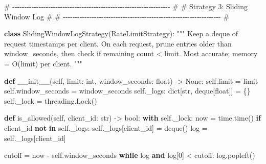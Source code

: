 \documentclass[11pt]{article}
\newenvironment{Shaded}{\begin{snugshade}}{\end{snugshade}}
\newcommand{\BuiltInTok}[1]{\textcolor[rgb]{0.50,0.55,0.55}{#1}}
\newcommand{\CommentTok}[1]{\textcolor[rgb]{0.48,0.49,0.49}{#1}}
\newcommand{\ControlFlowTok}[1]{\textcolor[rgb]{0.99,0.74,0.29}{\textbf{#1}}}
\newcommand{\DecValTok}[1]{\textcolor[rgb]{0.96,0.45,0.00}{#1}}
\newcommand{\FunctionTok}[1]{\textcolor[rgb]{0.56,0.27,0.68}{#1}}
\newcommand{\KeywordTok}[1]{\textcolor[rgb]{0.81,0.81,0.76}{\textbf{#1}}}
\newcommand{\NormalTok}[1]{\textcolor[rgb]{0.81,0.81,0.76}{#1}}
\newcommand{\OperatorTok}[1]{\textcolor[rgb]{0.81,0.81,0.76}{#1}}
\newcommand{\VariableTok}[1]{\textcolor[rgb]{0.15,0.68,0.68}{#1}}
\begin{document}
\begin{Shaded}
\begin{Highlighting}[]
\CommentTok{\# {-}{-}{-}{-}{-}{-}{-}{-}{-}{-}{-}{-}{-}{-}{-}{-}{-}{-}{-}{-}{-}{-}{-}{-}{-}{-}{-}{-}{-}{-}{-}{-}{-}{-}{-}{-}{-}{-}{-}{-}{-}{-}{-}{-}{-}{-}{-}{-}{-}{-}{-}{-}{-}{-}{-}{-}{-}{-}{-}{-}{-}{-}{-}{-}{-}{-} \#}
\CommentTok{\# Strategy 3: Sliding Window Log                                      \#}
\CommentTok{\# {-}{-}{-}{-}{-}{-}{-}{-}{-}{-}{-}{-}{-}{-}{-}{-}{-}{-}{-}{-}{-}{-}{-}{-}{-}{-}{-}{-}{-}{-}{-}{-}{-}{-}{-}{-}{-}{-}{-}{-}{-}{-}{-}{-}{-}{-}{-}{-}{-}{-}{-}{-}{-}{-}{-}{-}{-}{-}{-}{-}{-}{-}{-}{-}{-}{-} \#}

\KeywordTok{class}\NormalTok{ SlidingWindowLogStrategy(RateLimitStrategy):}
    \CommentTok{"""}
\CommentTok{    Keep a deque of request timestamps per client.}
\CommentTok{    On each request, prune entries older than \textasciigrave{}window\_seconds\textasciigrave{},}
\CommentTok{    then check if remaining count \textless{} limit.}
\CommentTok{    Most accurate; memory = O(limit) per client.}
\CommentTok{    """}

    \KeywordTok{def} \FunctionTok{\_\_init\_\_}\NormalTok{(}\VariableTok{self}\NormalTok{, limit: }\BuiltInTok{int}\NormalTok{, window\_seconds: }\BuiltInTok{float}\NormalTok{) }\OperatorTok{{-}\textgreater{}} \VariableTok{None}\NormalTok{:}
        \VariableTok{self}\NormalTok{.limit }\OperatorTok{=}\NormalTok{ limit}
        \VariableTok{self}\NormalTok{.window\_seconds }\OperatorTok{=}\NormalTok{ window\_seconds}
        \VariableTok{self}\NormalTok{.\_logs: }\BuiltInTok{dict}\NormalTok{[}\BuiltInTok{str}\NormalTok{, deque[}\BuiltInTok{float}\NormalTok{]] }\OperatorTok{=}\NormalTok{ \{\}}
        \VariableTok{self}\NormalTok{.\_lock }\OperatorTok{=}\NormalTok{ threading.Lock()}

    \KeywordTok{def}\NormalTok{ is\_allowed(}\VariableTok{self}\NormalTok{, client\_id: }\BuiltInTok{str}\NormalTok{) }\OperatorTok{{-}\textgreater{}} \BuiltInTok{bool}\NormalTok{:}
        \ControlFlowTok{with} \VariableTok{self}\NormalTok{.\_lock:}
\NormalTok{            now }\OperatorTok{=}\NormalTok{ time.time()}
            \ControlFlowTok{if}\NormalTok{ client\_id }\KeywordTok{not} \KeywordTok{in} \VariableTok{self}\NormalTok{.\_logs:}
                \VariableTok{self}\NormalTok{.\_logs[client\_id] }\OperatorTok{=}\NormalTok{ deque()}
\NormalTok{            log }\OperatorTok{=} \VariableTok{self}\NormalTok{.\_logs[client\_id]}

\NormalTok{            cutoff }\OperatorTok{=}\NormalTok{ now }\OperatorTok{{-}} \VariableTok{self}\NormalTok{.window\_seconds}
            \ControlFlowTok{while}\NormalTok{ log }\KeywordTok{and}\NormalTok{ log[}\DecValTok{0}\NormalTok{] }\OperatorTok{\textless{}}\NormalTok{ cutoff:}
\NormalTok{                log.popleft()}


\end{Highlighting}
\end{Shaded}
\end{document}
